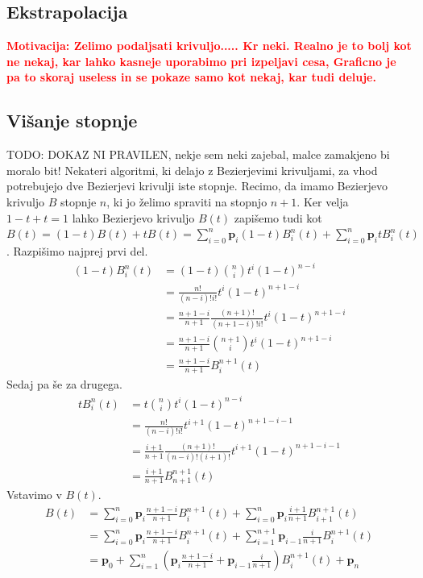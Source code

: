 \documentclass[isrm2, tisk]{fmfdelo}
\newcommand{\mycomment}[1]{\textbf{\textcolor{red}{#1}}}
\begin{document}
    \subsection{Ekstrapolacija}
    \mycomment{Motivacija: Zelimo podaljsati krivuljo..... Kr neki. Realno je to bolj kot ne nekaj, kar lahko kasneje uporabimo pri izpeljavi cesa, Graficno je pa to skoraj useless in se pokaze samo kot nekaj, kar tudi deluje.}

    \subsection{Višanje stopnje}
    TODO: DOKAZ NI PRAVILEN, nekje sem neki zajebal, malce zamakjeno bi moralo bit!
    Nekateri algoritmi, ki delajo z Bezierjevimi krivuljami, za vhod potrebujejo dve Bezierjevi krivulji iste stopnje.
    Recimo, da imamo Bezierjevo krivuljo $B$ stopnje $n$, ki jo želimo spraviti na stopnjo $n+1$.
    Ker velja $1-t+t=1$ lahko Bezierjevo krivuljo $B(t)$ zapišemo tudi kot $B(t) = (1-t)B(t)+tB(t) = \sum_{i=0}^{n}\mathbf{p}_{i}(1-t)B_i^n(t) +\sum_{i=0}^{n}\mathbf{p}_{i}tB_i^n(t) $.
    Razpišimo najprej prvi del.
    \begin{align*}
    (1-t)
        B_i^n(t) &= (1-t)\binom{n}{i}t^i(1-t)^{n-i} \\
        &= \frac{n!}{(n-i)!i!}t^i(1-t)^{n+1-i} \\
        &=\frac{n+1-i}{n+1}\frac{(n+1)!}{(n+1-i)!i!}t^i(1-t)^{n+1-i}\\
        &=\frac{n+1-i}{n+1} \binom{n+1}{i}t^i(1-t)^{n+1-i} \\
        &=\frac{n+1-i}{n+1}B_{i}^{n+1}(t)
    \end{align*}
    Sedaj pa še za drugega.
    \begin{align*}
        tB_i^n(t) &= t\binom{n}{i}t^i(1-t)^{n-i} \\
        &= \frac{n!}{(n-i)!i!}t^{i+1}(1-t)^{n+1-i-1} \\
        &= \frac{i+1}{n+1}\frac{(n+1)!}{(n-i)!(i+1)!}t^{i+1}(1-t)^{n+1-i-1} \\
        &= \frac{i+1}{n+1}B_{n+1}^{n+1}(t)
    \end{align*}
    Vstavimo v $B(t)$.
    \begin{align*}
        B(t) &= \sum_{i=0}^{n}\mathbf{p}_{i}\frac{n+1-i}{n+1}B_{i}^{n+1}(t) +\sum_{i=0}^{n}\mathbf{p}_{i}\frac{i+1}{n+1}B_{i+1}^{n+1}(t)\\
        &= \sum_{i=0}^{n}\mathbf{p}_{i}\frac{n+1-i}{n+1}B_{i}^{n+1}(t) +\sum_{i=1}^{n+1}\mathbf{p}_{i-1}\frac{i}{n+1}B_{i}^{n+1}(t) \\
        &=\mathbf{p}_{0} + \sum_{i=1}^{n}\left(\mathbf{p}_{i}\frac{n+1-i}{n+1} + \mathbf{p}_{i-1}\frac{i}{n+1}\right)B_{i}^{n+1}(t)+\mathbf{p}_{n}
    \end{align*}
\end{document}
